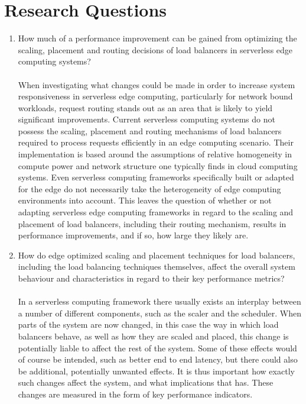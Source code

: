 \section{Research Questions}

\begin{enumerate}
    \item How much of a performance improvement can be gained from optimizing the scaling, placement and routing decisions of load balancers in serverless edge computing systems?\\\\
    When investigating what changes could be made in order to increase system responsiveness in serverless edge computing, particularly for network bound workloads, request routing stands out as an area that is likely to yield significant improvements. Current serverless computing systems do not possess the scaling, placement and routing mechanisms of load balancers required to process requests efficiently in an edge computing scenario. Their implementation is based around the assumptions of relative homogeneity in compute power and network structure one typically finds in cloud computing systems. Even serverless computing frameworks specifically built or adapted for the edge do not necessarily take the heterogeneity of edge computing environments into account. %
    This leaves the question of whether or not adapting serverless edge computing frameworks in regard to the scaling and placement of load balancers, including their routing mechanism, results in performance improvements, and if so, how large they likely are.
    
    \item How do edge optimized scaling and placement techniques for load balancers, including the load balancing techniques themselves, affect the overall system behaviour and characteristics in regard to their key performance metrics?\\\\
    In a serverless computing framework there usually exists an interplay between a number of different components, such as the scaler and the scheduler. %
    When parts of the system are now changed, in this case the way in which load balancers behave, as well as how they are scaled and placed, this change is potentially liable to affect the rest of the system. Some of these effects would of course be intended, such as better end to end latency, but there could also be additional, potentially unwanted effects. It is thus important how exactly such changes affect the system, and what implications that has. These changes are measured in the form of key performance indicators.
    

\end{enumerate}
